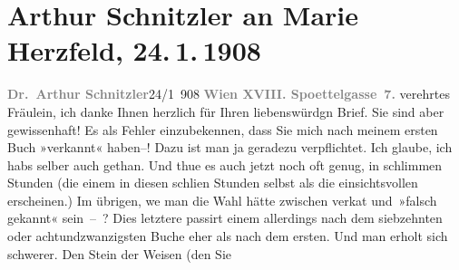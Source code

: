 

               \section[Arthur Schnitzler an Marie Herzfeld, 24. 1. 1908]{ Arthur Schnitzler an Marie Herzfeld, 24. 1. 1908}\nopagebreak{}\rehead{ }\begin{ledgroupsized}[t]{13cm}\normalsize\beginnumbering{} \toendnotes[C]{\smallbreak\pagebreak[2]} 
\toendnotes[C]{\smallbreak}\pstart
           {\pb}\textcolor{gray}{\textbf{Dr. Arthur Schnitzler}}\hfill 24/1 908\pend
           \pstart
           \textcolor{gray}{\textbf{Wien XVIII. Spoettelgasse 7.}}\pend
           \pstart{}verehrtes Fräulein,\pend\pstart
           ich danke Ihnen herzlich für Ihren liebenswürdgn Brief. Sie sind aber gewissenhaft!
               Es als Fehler einzubekennen, dass Sie mich nach meinem ersten Buch »verkannt« haben–!
               Dazu ist man ja geradezu verpflichtet. Ich glaube, ich habs selber auch gethan. Und
               thue es auch jetzt noch oft genug, in schlimmen Stunden (die einem in diesen schli{\geminationm}en Stunden selbst als die einsichtsvollen erscheinen.)
               Im übrigen, we{\geminationn} man die Wahl hätte zwischen verka{\geminationn}t und {\pb}»falsch
               gekannt« sein – ? Dies letztere passirt einem allerdings nach dem siebzehnten oder
               achtundzwanzigsten Buche eher als nach dem ersten. Und man erholt sich schwerer. Den
                  Stein der Weisen (den Sie

\end{ledgroupsized}
